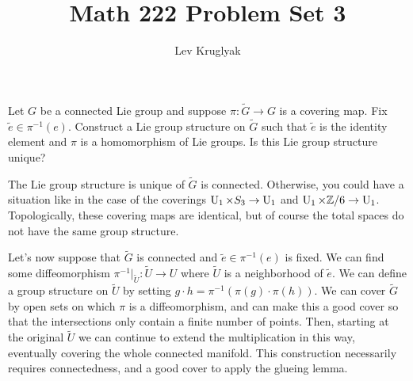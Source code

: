 \documentclass{lkx_pset}
\title{Math 222 Problem Set 3}
\author{Lev Kruglyak}
\begin{document}
\maketitle

\begin{problem}{2}
  Let $G$ be a connected Lie group and suppose $\pi : \widetilde{G} \to G$ is a covering map. Fix $\widetilde{e}\in \pi^{-1}(e)$. Construct a Lie group structure on $\widetilde{G}$ such that $\widetilde{e}$ is the identity element and $\pi$ is a homomorphism of Lie groups. Is this Lie group structure unique?
\end{problem}
\begin{solution}
  The Lie group structure is unique of $\widetilde{G}$ is connected. Otherwise, you could have a situation like in the case of the coverings $\operatorname{U}_1\times S_3 \to \operatorname{U}_1$ and $\operatorname{U}_1\times \mathbb{Z}/6 \to \operatorname{U}_1$. Topologically, these covering maps are identical, but of course the total spaces do not have the same group structure. 

  Let's now suppose that $\widetilde{G}$ is connected and $\widetilde{e}\in \pi^{-1}(e)$ is fixed. We can find some diffeomorphism $\pi^{-1}|_{\widetilde{U}} : \widetilde{U} \to U$ where $\widetilde{U}$ is a neighborhood of $\widetilde{e}$. We can define a group structure on $\widetilde{U}$ by setting $g\cdot h = \pi^{-1}(\pi(g)\cdot \pi(h))$. We can cover $\widetilde{G}$ by open sets on which $\pi$ is a diffeomorphism, and can make this a good cover so that the intersections only contain a finite number of points. Then, starting at the original $\widetilde{U}$ we can continue to extend the multiplication in this way, eventually covering the whole connected manifold. This construction necessarily requires connectedness, and a good cover to apply the glueing lemma.
\end{solution}
\end{document}
